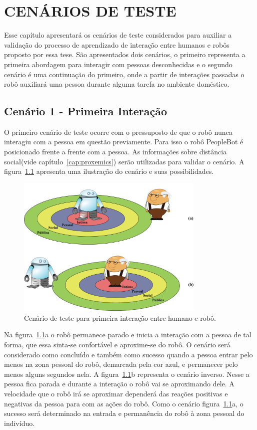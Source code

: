 \chapter{CENÁRIOS DE TESTE}
\label{cap:testes}
Esse capítulo apresentará os cenários de teste considerados para auxiliar a validação do processo de aprendizado de interação entre humanos e robôs proposto por essa tese. São apresentados dois cenários, o primeiro representa a primeira abordagem para interagir com pessoas desconhecidas e o segundo cenário é uma continuação do primeiro, onde a partir de interações passadas o robô auxiliará uma pessoa durante alguma tarefa no ambiente doméstico.

\section{Cenário 1 - Primeira Interação}
\label{sec:cenario1}
O primeiro cenário de teste ocorre com o pressuposto de que o robô nunca interagiu com a pessoa em questão previamente. Para isso o robô PeopleBot é posicionado frente a frente com a pessoa. As informações sobre distância social(vide capítulo~\ref{cap:proxemics}) serão utilizadas para validar o cenário. A figura~\ref{fig:cenario1} apresenta uma ilustração do cenário e suas possibilidades.

\begin{figure}[ht!]
	\centering
	\includegraphics[width=0.8\textwidth]{images/cenario01.png}
	\caption{Cenário de teste para primeira interação entre humano e robô.}
	\label{fig:cenario1}
\end{figure}

Na figura~\ref{fig:cenario1}a o robô permanece parado e inicia a interação com a pessoa de tal forma, que essa sinta-se confortável e aproxime-se do robô. O cenário será considerado como concluído e também como sucesso quando a pessoa entrar pelo menos na zona pessoal do robô, demarcada pela cor azul, e permanecer pelo menos alguns segundos nela. A figura~\ref{fig:cenario1}b representa o cenário inverso. Nesse a pessoa fica parada e durante a interação o robô vai se aproximando dele. A velocidade que o robô irá se aproximar dependerá das reações positivas e negativas da pessoa para com as ações do robô. Como o cenário figura~\ref{fig:cenario1}a, o sucesso será determinado na entrada e permanência do robô à zona pessoal do indivíduo.


